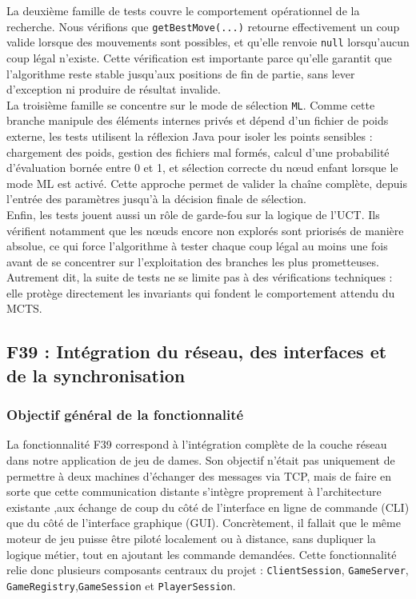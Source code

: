 \documentclass[a4paper]{article}
\begin{document}
La deuxième famille de tests couvre le comportement opérationnel de la recherche. Nous vérifions que \texttt{getBestMove(...)}
retourne effectivement un coup valide lorsque des mouvements sont possibles, et qu'elle renvoie \texttt{null} lorsqu'aucun coup
légal n'existe. Cette vérification est importante parce qu'elle garantit que l'algorithme reste stable jusqu'aux positions de fin
de partie, sans lever d'exception ni produire de résultat invalide. \\

La troisième famille se concentre sur le mode de sélection \texttt{ML}. Comme cette branche manipule des éléments internes privés
et dépend d'un fichier de poids externe, les tests utilisent la réflexion Java pour isoler les points sensibles : chargement des
poids, gestion des fichiers mal formés, calcul d'une probabilité d'évaluation bornée entre 0 et 1, et sélection correcte du
nœud enfant lorsque le mode ML est activé. Cette approche permet de valider la chaîne complète, depuis l'entrée des paramètres
jusqu'à la décision finale de sélection. \\

Enfin, les tests jouent aussi un rôle de garde-fou sur la logique de l'UCT. Ils vérifient notamment que les nœuds encore non
explorés sont priorisés de manière absolue, ce qui force l'algorithme à tester chaque coup légal au moins une fois avant de se
concentrer sur l'exploitation des branches les plus prometteuses. Autrement dit, la suite de tests ne se limite pas à des
vérifications techniques : elle protège directement les invariants qui fondent le comportement attendu du MCTS.

\subsection{F39 : Intégration du réseau, des interfaces et de la synchronisation}

\subsubsection{Objectif général de la fonctionnalité}

La fonctionnalité F39 correspond à l'intégration complète de la couche réseau dans notre application de jeu de dames.
Son objectif n'était pas uniquement de permettre à deux machines d'échanger des messages via TCP, 
mais de faire en sorte que cette communication distante s'intègre proprement à l'architecture existante ,aux échange de coup  
 du côté de l'interface en ligne de commande (CLI) que du côté de l'interface graphique (GUI). 
Concrètement, il fallait que le même moteur de jeu puisse être piloté localement ou à distance, 
sans dupliquer la logique métier, tout en ajoutant les commande demandées. Cette fonctionnalité relie 
donc plusieurs composants centraux du projet : {\texttt{ClientSession}}, {\texttt{GameServer}}, 
{\texttt{GameRegistry}},{\texttt{GameSession}} et {\texttt{PlayerSession}}.
\end{document}
